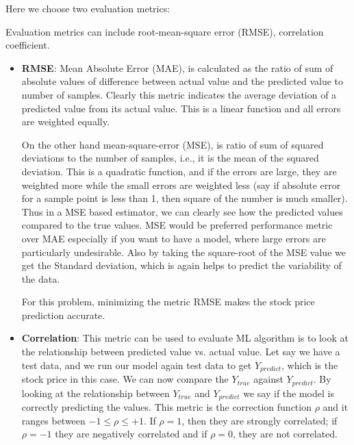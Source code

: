 \documentclass[12pt]{article}
\begin{document}
Here we choose two evaluation metrics:

Evaluation metrics can include root-mean-square error (RMSE), correlation coefficient. 

\begin{itemize}

\item {\bf RMSE}:  Mean Absolute Error (MAE), is calculated as the ratio of sum of absolute values of difference between actual value and the predicted value to number of samples. Clearly this metric indicates the average deviation of a predicted value from its actual value. This is a linear function and all errors are weighted equally.

On the other hand mean-square-error (MSE), is ratio of sum of squared deviations to the number of samples, i.e., it is the mean of the squared deviation. This is a quadratic function, and if the errors are large, they are weighted more while the small errors are weighted less (say if absolute error for a sample point is less than 1, then square of the number is much smaller). Thus in a MSE based estimator, we can clearly see how the predicted values compared to the true values. MSE would be preferred performance metric over MAE especially if you want to have a model, where large errors are particularly undesirable.  Also by taking the square-root of the MSE value we get the Standard deviation, which is again helps to predict the variability of the data. 

For this problem, minimizing the metric RMSE makes the stock price prediction accurate.

\item {\bf Correlation}: This metric can be used to evaluate ML algorithm is to look at the relationship between predicted value vs. actual value. Let say we have a test data, and we run our model again test data to get $Y_{predict}$, which is the stock price in this case. We can now compare the $Y_{true}$ against $Y_{predict}$. By looking at the relationship between  $Y_{true}$ and $Y_{predict}$ we say if the model is correctly predicting the values. This metric is the correction function $\rho$ and it ranges between $-1 \leq \rho \leq +1$. If $\rho=1$, then they are strongly correlated; if $\rho=-1$ they are negatively correlated and if $\rho=0$, they are not correlated. 

\end{itemize}
\end{document}
